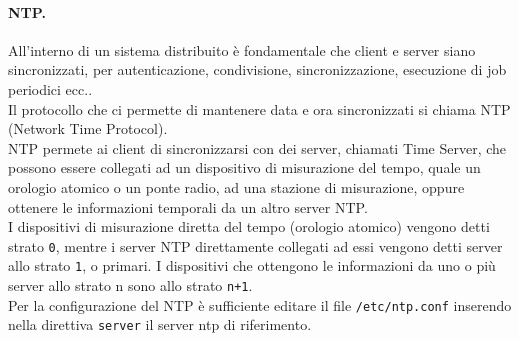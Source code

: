 \documentclass[a4paper]{report}
\begin{document}
\paragraph{NTP.} All'interno di un sistema distribuito è fondamentale che client e server siano sincronizzati, per autenticazione, condivisione, sincronizzazione, esecuzione di job periodici ecc..\\
Il protocollo che ci permette di mantenere data e ora sincronizzati si chiama NTP (Network Time Protocol).\\
NTP permete ai client di sincronizzarsi con dei server,
chiamati Time Server, che possono essere collegati ad un
dispositivo di misurazione del tempo, quale un orologio
atomico o un ponte radio, ad una stazione di misurazione,
oppure ottenere le informazioni temporali da un altro server
NTP.\\
I dispositivi di misurazione diretta del tempo (orologio
atomico) vengono detti strato \texttt{0}, mentre i server NTP
direttamente collegati ad essi vengono detti server allo strato
\texttt{1}, o primari. I dispositivi che ottengono le informazioni da uno
o più server allo strato n sono allo strato \texttt{n+1}.\\
Per la configurazione del NTP è sufficiente editare il file \texttt{/etc/ntp.conf} inserendo nella direttiva \texttt{server} il server ntp di riferimento.\\
\end{document}
